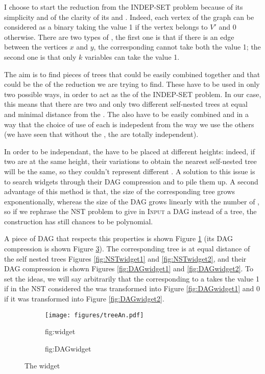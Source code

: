 I choose to start the reduction from the INDEP-SET problem because
of its simplicity and of the clarity of its \constraints and
\variables. Indeed, each vertex of the graph can be considered as
a binary \variable taking the value 1 if the vertex belongs to $V'$
and 0 otherwise. There are two types of \constraints, the first one is that
if there is an edge between the vertices $x$ and $y$, the
corresponding \variables cannot take both the value 1; the second one is
that only $k$ variables can take the value 1.

The aim is to find pieces of trees that could be easily combined
together and that could be the \widgets of the reduction we are trying
to find. These \widgets have to be used in only two possible ways, in
order to act as the \variables of the INDEP-SET problem. In our case,
this means that there are two and only two different self-nested trees
at equal and minimal distance from the \widget. The \widgets also have
to be easily combined and in a way that the choice of use of each
\widget is indepedent from the way we use the others (we have seen
that without the \constraints, the \widgets are totally independent).

In order to be independant, the \widgets have to be placed at
different heights: indeed, if two \widgets are at the same height,
their variations to obtain the nearest self-nested tree will be the
same, so they couldn't represent different \variables. A solution to
this issue is to search widgets through their DAG compression and to
pile them up. A second advantage of this method is that, the size of
the corresponding tree grows exponentionally, whereas the size of the
DAG grows linearly with the number of \widgets, so if we rephrase the
NST problem to give in \textsc{Input} a DAG instead of a tree, the
construction has still chances to be polynomial.

A piece of DAG that respects this properties is shown Figure
\ref{fig:widget} (its DAG compression is shown Figure
\ref{fig:DAGwidget}). The corresponding tree is at equal distance of
the self nested trees Figures \ref{fig:NSTwidget1} and
\ref{fig:NSTwidget2}, and their DAG compression is shown Figures
\ref{fig:DAGwidget1} and \ref{fig:DAGwidget2}. To set the ideas, we
will say arbitrarily that the \variable corresponding to a \widget
takes the value 1 if in the NST considered the \widget was
transformed into Figure \ref{fig:DAGwidget1} and 0 if it was
transformed into Figure \ref{fig:DAGwidget2}.

\begin{figure}
 \begin{subfigure}[b]{0.45\textwidth}
    \centering
    \texttt{[image: figures/treeAn.pdf]}
    \caption{fig:widget}
    \label{fig:widget}
  \end{subfigure}
  \quad
  \begin{subfigure}[b]{0.45\textwidth}
    \centering
    \caption{fig:DAGwidget}
    \label{fig:DAGwidget}
  \end{subfigure} 
  \caption{The widget}%
\end{figure}

